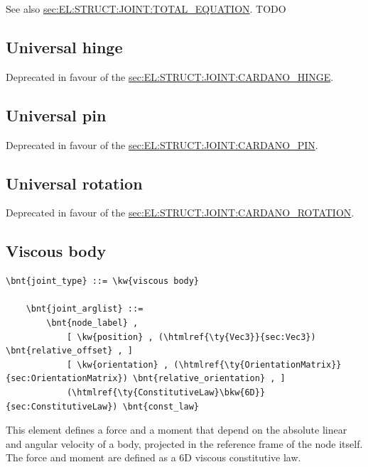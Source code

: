 See also 
\hyperref{\kw{total equation}}{\kw{total equation} (see Section~}{)}{sec:EL:STRUCT:JOINT:TOTAL_EQUATION}.
TODO




\subsection{Universal hinge}
\label{sec:EL:STRUCT:JOINT:UNIVERSAL_HINGE}
Deprecated in favour of the
\hyperref{\kw{cardano hinge}}{\kw{cardano hinge} (see Section~}{)}{sec:EL:STRUCT:JOINT:CARDANO_HINGE}.



\subsection{Universal pin}
\label{sec:EL:STRUCT:JOINT:UNIVERSAL_PIN}
Deprecated in favour of the
\hyperref{\kw{cardano pin}}{\kw{cardano pin} (see Section~}{)}{sec:EL:STRUCT:JOINT:CARDANO_PIN}.



\subsection{Universal rotation}
\label{sec:EL:STRUCT:JOINT:UNIVERSAL_ROTATION}
Deprecated in favour of the
\hyperref{\kw{cardano rotation}}{\kw{cardano rotation} (see Section~}{)}{sec:EL:STRUCT:JOINT:CARDANO_ROTATION}.

\subsection{Viscous body}
\label{sec:EL:STRUCT:JOINT:VISCOUS_BODY}
\begin{Verbatim}[commandchars=\\\{\}]
    \bnt{joint_type} ::= \kw{viscous body}

    \bnt{joint_arglist} ::=
        \bnt{node_label} ,
            [ \kw{position} , (\htmlref{\ty{Vec3}}{sec:Vec3}) \bnt{relative_offset} , ]
            [ \kw{orientation} , (\htmlref{\ty{OrientationMatrix}}{sec:OrientationMatrix}) \bnt{relative_orientation} , ]
            (\htmlref{\ty{ConstitutiveLaw}\bkw{6D}}{sec:ConstitutiveLaw}) \bnt{const_law}
\end{Verbatim}
This element defines a force and a moment that depend on the absolute 
linear and angular velocity of a body, projected in the reference frame
of the node itself.
The force and moment are defined as a 6D viscous constitutive law.


